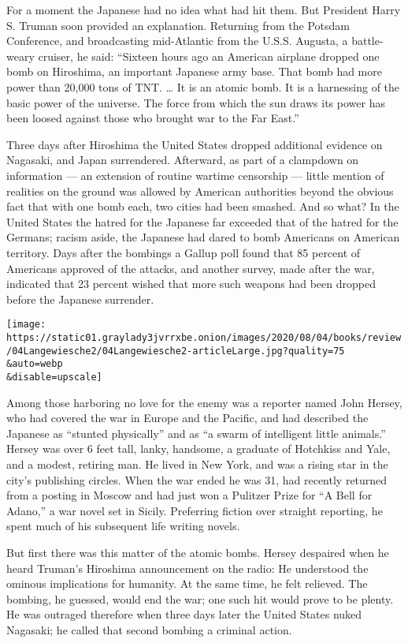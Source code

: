For a moment the Japanese had no idea what had hit them. But President
Harry S. Truman soon provided an explanation. Returning from the Potsdam
Conference, and broadcasting mid-Atlantic from the U.S.S. Augusta, a
battle-weary cruiser, he said: ``Sixteen hours ago an American airplane
dropped one bomb on Hiroshima, an important Japanese army base. That
bomb had more power than 20,000 tons of TNT. \ldots{} It is an atomic
bomb. It is a harnessing of the basic power of the universe. The force
from which the sun draws its power has been loosed against those who
brought war to the Far East.''

Three days after Hiroshima the United States dropped additional evidence
on Nagasaki, and Japan surrendered. Afterward, as part of a clampdown on
information --- an extension of routine wartime censorship --- little
mention of realities on the ground was allowed by American authorities
beyond the obvious fact that with one bomb each, two cities had been
smashed. And so what? In the United States the hatred for the Japanese
far exceeded that of the hatred for the Germans; racism aside, the
Japanese had dared to bomb Americans on American territory. Days after
the bombings a Gallup poll found that 85 percent of Americans approved
of the attacks, and another survey, made after the war, indicated that
23 percent wished that more such weapons had been dropped before the
Japanese surrender.

\texttt{[image: https://static01.graylady3jvrrxbe.onion/images/2020/08/04/books/review/04Langewiesche2/04Langewiesche2-articleLarge.jpg?quality=75\\\&auto=webp\\\&disable=upscale]}

Among those harboring no love for the enemy was a reporter named John
Hersey, who had covered the war in Europe and the Pacific, and had
described the Japanese as ``stunted physically'' and as ``a swarm of
intelligent little animals.'' Hersey was over 6 feet tall, lanky,
handsome, a graduate of Hotchkiss and Yale, and a modest, retiring man.
He lived in New York, and was a rising star in the city's publishing
circles. When the war ended he was 31, had recently returned from a
posting in Moscow and had just won a Pulitzer Prize for ``A Bell for
Adano,'' a war novel set in Sicily. Preferring fiction over straight
reporting, he spent much of his subsequent life writing novels.

But first there was this matter of the atomic bombs. Hersey despaired
when he heard Truman's Hiroshima announcement on the radio: He
understood the ominous implications for humanity. At the same time, he
felt relieved. The bombing, he guessed, would end the war; one such hit
would prove to be plenty. He was outraged therefore when three days
later the United States nuked Nagasaki; he called that second bombing a
criminal action.

